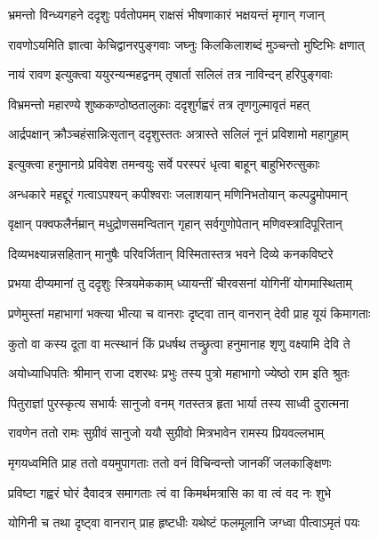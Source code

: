 \twolineshloka
{भ्रमन्तो विन्ध्यगहने ददृशुः पर्वतोपमम्}
{राक्षसं भीषणाकारं भक्षयन्तं मृगान् गजान्} %

\twolineshloka
{रावणोऽयमिति ज्ञात्वा केचिद्वानरपुङ्गवाः}
{जघ्नुः किलकिलाशब्दं मुञ्चन्तो मुष्टिभिः क्षणात्} %

\twolineshloka
{नायं रावण इत्युक्त्वा ययुरन्यन्महद्वनम्}
{तृषार्ता सलिलं तत्र नाविन्दन् हरिपुङ्गवाः} %

\twolineshloka
{विभ्रमन्तो महारण्ये शुष्ककण्ठोष्ठतालुकाः}
{ददृशुर्गह्वरं तत्र तृणगुल्मावृतं महत्} %

\twolineshloka
{आर्द्रपक्षान् क्रौञ्चहंसान्निःसृतान् ददृशुस्ततः}
{अत्रास्ते सलिलं नूनं प्रविशामो महागुहाम्} %

\twolineshloka
{इत्युक्त्वा हनुमानग्रे प्रविवेश तमन्वयुः}
{सर्वे परस्परं धृत्वा बाहून् बाहुभिरुत्सुकाः} %

\twolineshloka
{अन्धकारे महद्दूरं गत्वाऽपश्यन् कपीश्वराः}
{जलाशयान् मणिनिभतोयान् कल्पद्रुमोपमान्} %

\twolineshloka
{वृक्षान् पक्वफलैर्नम्रान् मधुद्रोणसमन्वितान्}
{गृहान् सर्वगुणोपेतान् मणिवस्त्रादिपूरितान्} %

\twolineshloka
{दिव्यभक्ष्यान्नसहितान् मानुषैः परिवर्जितान्}
{विस्मितास्तत्र भवने दिव्ये कनकविष्टरे} %

\twolineshloka
{प्रभया दीप्यमानां तु ददृशुः स्त्रियमेककाम्}
{ध्यायन्तीं चीरवसनां योगिनीं योगमास्थिताम्} %

\twolineshloka
{प्रणेमुस्तां महाभागां भक्त्या भीत्या च वानराः}
{दृष्ट्वा तान् वानरान् देवी प्राह यूयं किमागताः} %

\twolineshloka
{कुतो वा कस्य दूता वा मत्स्थानं किं प्रधर्षथ}
{तच्छ्रुत्वा हनुमानाह शृणु वक्ष्यामि देवि ते} %

\twolineshloka
{अयोध्याधिपतिः श्रीमान् राजा दशरथः प्रभुः}
{तस्य पुत्रो महाभागो ज्येष्ठो राम इति श्रुतः} %

\twolineshloka
{पितुराज्ञां पुरस्कृत्य सभार्यः सानुजो वनम्}
{गतस्तत्र हृता भार्या तस्य साध्वी दुरात्मना} %

\twolineshloka
{रावणेन ततो रामः सुग्रीवं सानुजो ययौ}
{सुग्रीवो मित्रभावेन रामस्य प्रियवल्लभाम्} %

\twolineshloka
{मृगयध्वमिति प्राह ततो वयमुपागताः}
{ततो वनं विचिन्वन्तो जानकीं जलकाङ्क्षिणः} %

\twolineshloka
{प्रविष्टा गह्वरं घोरं दैवादत्र समागताः}
{त्वं वा किमर्थमत्रासि का वा त्वं वद नः शुभे} %

\twolineshloka
{योगिनी च तथा दृष्ट्वा वानरान् प्राह हृष्टधीः}
{यथेष्टं फलमूलानि जग्ध्वा पीत्वाऽमृतं पयः} %

